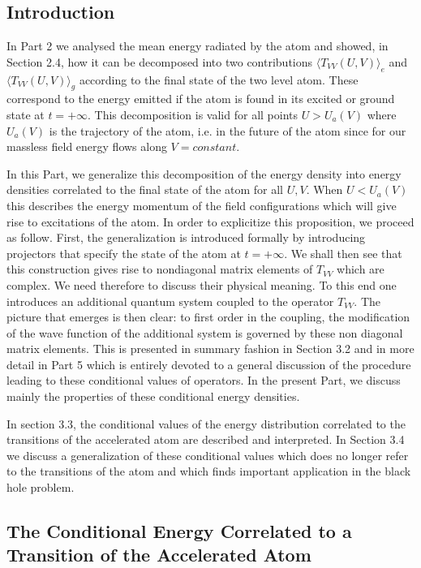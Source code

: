 \documentclass[12pt]{article}
\begin{document}
\subsection{Introduction}\label{deco}

 In Part 2 we analysed the mean energy radiated by
the atom and showed, in Section 2.4,
how it can be
decomposed into two contributions $\langle T_{VV}(U,V)
\rangle _e$ and $\langle T_{VV}(U,V) \rangle _g$ according
to the final state of the two level atom. These correspond
to the energy emitted if the atom is found in its excited
or ground state at $t=+\infty$. This decomposition is valid
for all points $U>U_a(V)$ where $U_a(V)$ is the trajectory
of the atom, i.e. in the future of the atom since for our massless
field energy flows along $V=constant$.

In this
Part, we generalize this decomposition of the energy
density into energy densities
correlated to the final state of the atom
for all $U,V$.
When $U<U_a(V) $
this describes the energy momentum of the field
configurations
which will give rise to
excitations of the
atom. In order to explicitize this proposition,
we proceed as follow. First, the generalization is introduced formally by
introducing projectors that specify the state of the atom
at $t=+\infty$. We shall then see that this construction gives rise to
nondiagonal matrix elements of $T_{VV}$ which are complex.
We need therefore to discuss their physical meaning.
To this end one
introduces an additional quantum system coupled to the operator
$T_{VV}$. The picture that emerges is then clear: to first order
in the coupling, the modification of the wave function of the additional
system is governed by these non diagonal matrix elements.
This is presented in summary fashion
in Section 3.2 and in more detail in Part 5 which is entirely
devoted to a general discussion of the procedure leading to
these conditional values of operators.
In the present Part, we discuss mainly the properties of these conditional
 energy densities.

In section 3.3, the conditional values of the
energy distribution correlated to the transitions of the accelerated atom
are described and interpreted. In Section 3.4 we
discuss a generalization of these conditional values
which does no longer refer to the transitions of the atom
and  which finds important application in the black hole
problem.

\subsection{The Conditional Energy Correlated to a Transition of the
Accelerated Atom}\label{conddec}
\end{document}
